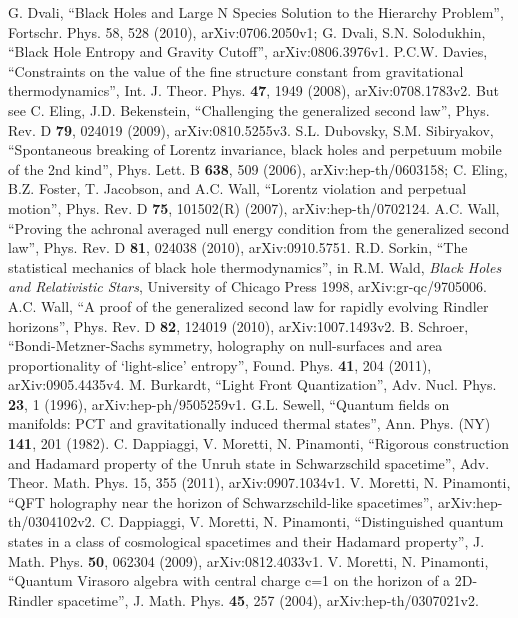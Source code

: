 \documentclass{article}
\begin{document}
\begin{thebibliography}{299}
G. Dvali, ``Black Holes and Large N Species Solution to the Hierarchy Problem'', Fortschr. Phys. 58, 528 (2010), arXiv:0706.2050v1; G. Dvali, S.N. Solodukhin, ``Black Hole Entropy and Gravity Cutoff'', arXiv:0806.3976v1.
P.C.W. Davies, ``Constraints on the value of the fine structure constant from gravitational thermodynamics'', Int. J. Theor. Phys. \textbf{47}, 1949 (2008), arXiv:0708.1783v2.  But see C. Eling, J.D. Bekenstein, ``Challenging the generalized second law'', Phys. Rev. D \textbf{79}, 024019 (2009), arXiv:0810.5255v3.
S.L. Dubovsky, S.M. Sibiryakov, ``Spontaneous breaking of Lorentz invariance, black holes and perpetuum mobile of the 2nd kind'', Phys. Lett. B \textbf{638}, 509 (2006), arXiv:hep-th/0603158; C. Eling, B.Z. Foster, T. Jacobson, and A.C. Wall, ``Lorentz violation and perpetual motion'', Phys. Rev. D \textbf{75}, 101502(R) (2007), arXiv:hep-th/0702124.
A.C. Wall, ``Proving the achronal averaged null energy condition from the generalized second law'', Phys. Rev. D \textbf{81}, 024038 (2010), arXiv:0910.5751.
R.D. Sorkin, ``The statistical mechanics of black hole thermodynamics'', in R.M. Wald, \textit{Black Holes and Relativistic Stars}, University of Chicago Press 1998, arXiv:gr-qc/9705006.
A.C. Wall, ``A proof of the generalized second law for rapidly evolving Rindler horizons'', 	Phys. Rev. D \textbf{82}, 124019 (2010), arXiv:1007.1493v2.
B. Schroer, ``Bondi-Metzner-Sachs symmetry, holography on null-surfaces and area proportionality of `light-slice' entropy'', Found. Phys. \textbf{41}, 204 (2011), arXiv:0905.4435v4.
M. Burkardt, ``Light Front Quantization'', Adv. Nucl. Phys. \textbf{23}, 1 (1996), arXiv:hep-ph/9505259v1.
G.L. Sewell, ``Quantum fields on manifolds: PCT and gravitationally induced thermal states'',  Ann. Phys. (NY) \textbf{141}, 201 (1982).
C. Dappiaggi, V. Moretti, N. Pinamonti, ``Rigorous construction and Hadamard property of the Unruh state in Schwarzschild spacetime'', Adv. Theor. Math. Phys. 15, 355 (2011), arXiv:0907.1034v1.
V. Moretti, N. Pinamonti, ``QFT holography near the horizon of Schwarzschild-like spacetimes'', arXiv:hep-th/0304102v2.
C. Dappiaggi, V. Moretti, N. Pinamonti, ``Distinguished quantum states in a class of cosmological spacetimes and their Hadamard property'', J. Math. Phys. \textbf{50}, 062304 (2009), arXiv:0812.4033v1.
V. Moretti, N. Pinamonti, ``Quantum Virasoro algebra with central charge c=1 on the horizon of a 2D-Rindler spacetime'', J. Math. Phys. \textbf{45}, 257 (2004), arXiv:hep-th/0307021v2.

\end{thebibliography}
\end{document}
